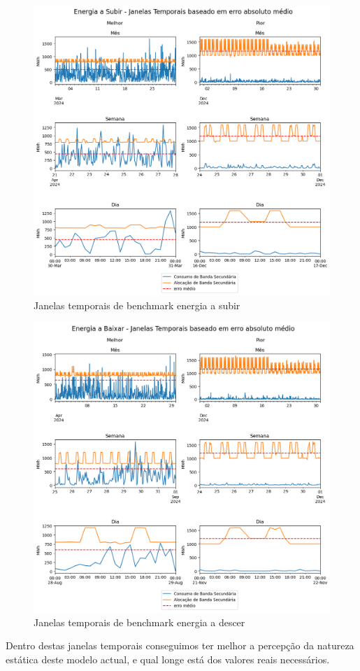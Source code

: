 \begin{figure}[H]
    \centering
    \includegraphics[width=\textwidth]{plots/alocacoes_temporais_upward_dataset.png}
    \caption{Janelas temporais de benchmark energia a subir}
    \label{fig:benchmarktimewindowsup}
\end{figure}


\begin{figure}[H]
    \centering
    \includegraphics[width=\textwidth]{plots/alocacoes_temporais_downward_dataset.png}
    \caption{Janelas temporais de benchmark energia a descer}
    \label{fig:benchmarktimewindowsdown}
\end{figure}

Dentro destas janelas temporais conseguimos ter melhor a percepção da natureza estática deste modelo actual, e qual longe está dos valores reais necessários.\\


